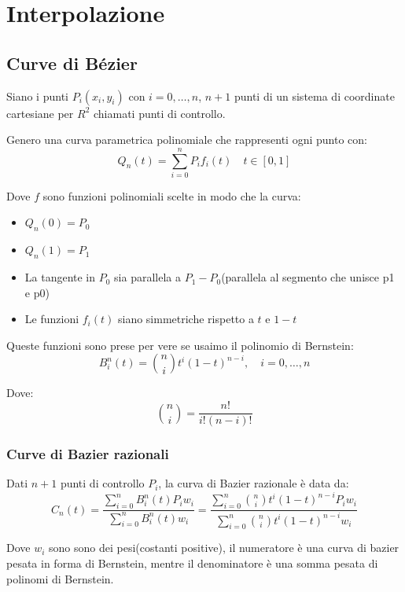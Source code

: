 \chapter{Interpolazione}
\section{Curve di Bézier}
Siano i punti $P_i(x_i, y_i)$ con $i = 0, \dots, n$, $n+1$ punti di un sistema di 
coordinate cartesiane per $R^2$ chiamati punti di controllo.

Genero una curva parametrica polinomiale che rappresenti ogni punto con:
\begin{equation}
  Q_n(t) = \sum_{i = 0}^{n} P_if_i(t) \quad t \in [0, 1]
\end{equation}


Dove $f$ sono funzioni polinomiali scelte in modo che la curva:
\begin{itemize}
  \item $Q_n(0) = P_0$
  \item $Q_n(1) = P_1$
  \item La tangente in $P_0$ sia parallela a $P_1 - P_0$(parallela al segmento che unisce 
  p1 e p0)
  \item Le funzioni $f_i(t)$ siano simmetriche rispetto a $t$ e $1 -t$
\end{itemize}


Queste funzioni sono prese per vere se usaimo il polinomio di Bernstein:
\begin{equation}
  B_i^n(t) = \binom{n}{i}t^i(1 - t)^{n-i}, \quad i = 0, \dots, n
  \label{eq:bernstein}
\end{equation}

Dove:
\begin{equation}
  \binom{n}{i} = \frac{n!}{i!(n-i)!}
\end{equation}

\subsection{Curve di Bazier razionali}
Dati $n+1$ punti di controllo $P_i$, la curva di Bazier razionale è data da:
\begin{equation}
  C_n(t) = \frac{\sum_{i=0}^{n}B_i^n(t)P_iw_i}{\sum_{i=0}^{n}B_i^n(t)w_i} = \frac{\sum_{i=0}^n\binom{n}{i}t^i(1-t)^{n-i}P_iw_i}{\sum_{i=0}^n\binom{n}{i}t^i(1-t)^{n-i}w_i}
\end{equation}

Dove $w_i$ sono sono dei pesi(costanti positive), il numeratore è una curva di bazier pesata
in forma di Bernstein, mentre il denominatore è una somma pesata di polinomi di Bernstein.

